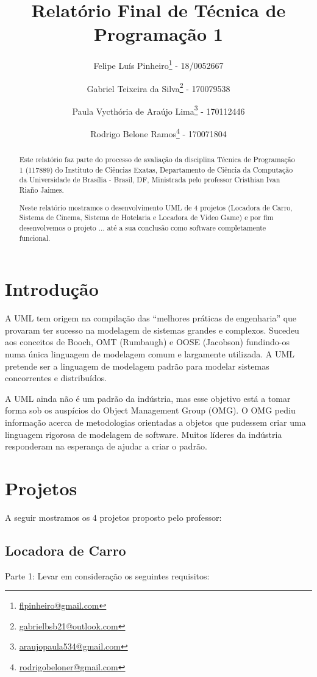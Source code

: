 \documentclass[a4paper,10pt]{article}
\title{Relatório Final de Técnica de Programação 1}
\author{
Felipe Luís Pinheiro\footnote{\href{mailto:flpinheiro@gmail.com}{flpinheiro@gmail.com}} - 18/0052667 \and 
Gabriel Teixeira da Silva\footnote{\href{mailto:gabrielbsb21@outlook.com}{gabrielbsb21@outlook.com}} - 170079538 \and 
Paula Vycthória de Araújo Lima\footnote{\href{mailto:araujopaula534@gmail.com}{araujopaula534@gmail.com}} - 170112446 \and 
Rodrigo Belone Ramos\footnote{\href{mailto:rodrigobeloner@gmail.com}{rodrigobeloner@gmail.com}} - 170071804}
\begin{document}
\maketitle

\begin{abstract}
Este relatório faz parte do processo de avaliação da disciplina Técnica de Programação 1 (117889) do Instituto de Ciências Exatas, Departamento de Ciência da Computação da Universidade de Brasília - Brasil, DF, Ministrada pelo professor Cristhian Ivan Riaño Jaimes. 

Neste relatório mostramos o desenvolvimento UML de 4 projetos (Locadora de Carro, Sistema de Cinema, Sistema de Hotelaria e Locadora de Video Game) e por fim desenvolvemos o projeto ... até a sua conclusão como software completamente funcional. 
\end{abstract}

\section{Introdução}

A UML tem origem na compilação das ``melhores práticas de engenharia'' que provaram ter sucesso na modelagem de sistemas grandes e complexos. Sucedeu aos conceitos de Booch, OMT (Rumbaugh) e OOSE (Jacobson) fundindo-os numa única linguagem de modelagem comum e largamente utilizada. A UML pretende ser a linguagem de modelagem padrão para modelar sistemas concorrentes e distribuídos.

A UML ainda não é um padrão da indústria, mas esse objetivo está a tomar forma sob os auspícios do Object Management Group (OMG). O OMG pediu informação acerca de metodologias orientadas a objetos que pudessem criar uma linguagem rigorosa de modelagem de software. Muitos líderes da indústria responderam na esperança de ajudar a criar o padrão. \cite{WebSite:UML}

\section{Projetos}

A seguir mostramos os 4 projetos proposto pelo professor:

\subsection{Locadora de Carro}

Parte 1: Levar em consideração os seguintes requisitos:
\end{document}
